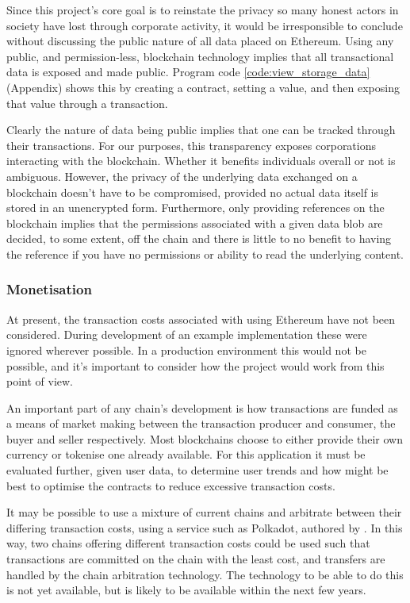 Since this project's core goal is to reinstate the privacy so many honest actors in society have lost through corporate activity, it would be irresponsible to conclude without discussing the public nature of all data placed on Ethereum. Using any public, and permission-less, blockchain technology implies that all transactional data is exposed and made public. Program code \ref{code:view_storage_data} (Appendix) shows this by creating a contract, setting a value, and then exposing that value through a transaction.

Clearly the nature of data being public implies that one can be tracked through their transactions. For our purposes, this transparency exposes corporations interacting with the blockchain. Whether it benefits individuals overall or not is ambiguous. However, the privacy of the underlying data exchanged on a blockchain doesn't have to be compromised, provided no actual data itself is stored in an unencrypted form. Furthermore, only providing references on the blockchain implies that the permissions associated with a given data blob are decided, to some extent, off the chain and there is little to no benefit to having the reference if you have no permissions or ability to read the underlying content.

\subsubsection{Monetisation}

At present, the transaction costs associated with using Ethereum have not been considered. During development of an example implementation these were ignored wherever possible. In a production environment this would not be possible, and it's important to consider how the project would work from this point of view.

An important part of any chain's development is how transactions are funded as a means of market making between the transaction producer and consumer, the buyer and seller respectively. Most blockchains choose to either provide their own currency or tokenise one already available. For this application it must be evaluated further, given user data, to determine user trends and how might be best to optimise the contracts to reduce excessive transaction costs.

It may be possible to use a mixture of current chains and arbitrate between their differing transaction costs, using a service such as Polkadot, authored by \cite{polkadot:2017:online}. In this way, two chains offering different transaction costs could be used such that transactions are committed on the chain with the least cost, and transfers are handled by the chain arbitration technology. The technology to be able to do this is not yet available, but is likely to be available within the next few years.

